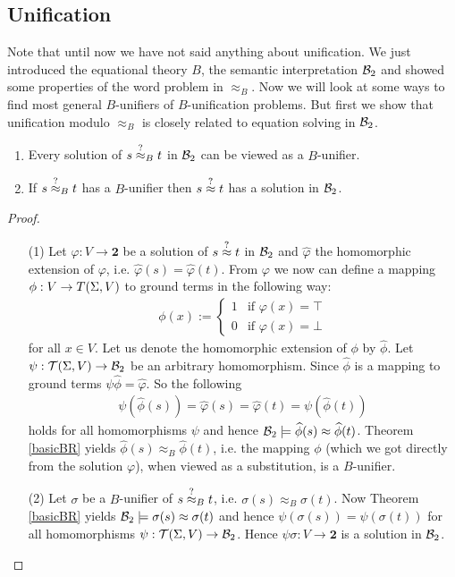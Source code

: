 	\subsection{Unification}
	Note that until now we have not said anything about unification. We just introduced the equational theory $B$, the semantic interpretation ${\mathcal{B}_2}$ and showed some properties of the word problem in $\approx_B$. Now we will look at some ways to find most general $B$-unifiers of $B$-unification problems. But first we show that unification modulo $\approx_B$ is closely related to equation solving in ${\mathcal{B}_2}$.
	\begin{lemma}\mbox{}
		\begin{enumerate}
			\item Every solution of $s\stackrel{?}{\approx}_B t$ in ${\mathcal{B}_2}$ can be viewed as a $B$-unifier.
			\item If $s\stackrel{?}{\approx}_B t$ has a $B$-unifier then $s\stackrel{?}{\approx} t$ has a solution in ${\mathcal{B}_2}$.
		\end{enumerate}
	\end{lemma}
	\begin{proof}\mbox{}
		\begin{itemize}
			\item[(1)]Let $\varphi:V\to\textbf{2}$ be a solution of $s\stackrel{?}{\approx} t$ in ${\mathcal{B}_2}$ and $\widehat{\varphi}$ the homomorphic extension of $\varphi$, i.e. $\widehat{\varphi}(s)=\widehat{\varphi}(t)$. From $\varphi$ we now can define a mapping $\phi:V\to T(\Sigma,V)$ to ground terms in the following way:
			      \begin{align*}
			      	\phi(x):=\begin{cases}
			      	1 & \text{if }\varphi(x)=\top \\
			      	0 & \text{if }\varphi(x)=\bot 
			      	\end{cases}
			      \end{align*}
			      for all $x\in V$. Let us denote the homomorphic extension of $\phi$ by $\widehat{\phi}$. Let $\psi:\mathcal{T}(\Sigma,V)\to{\mathcal{B}_2}$ be an arbitrary homomorphism. Since $\widehat{\phi}$ is a mapping to ground terms $\psi\widehat{\phi}=\widehat{\varphi}$. So the following
			      \begin{align*}
			      	\psi\left( \widehat{\phi}(s)\right)=\widehat{\varphi}(s)=\widehat{\varphi}(t)=\psi\left( \widehat{\phi}(t)\right) 
			      \end{align*}
			      holds for all homomorphisms $\psi$ and hence ${\mathcal{B}_2}\models\widehat{\phi}(s)\approx\widehat{\phi}(t)$. Theorem \ref{basicBR} yields $\widehat{\phi}(s)\approx_B\widehat{\phi}(t)$, i.e. the mapping $\phi$ (which we got directly from the solution $\varphi$), when viewed as a substitution, is a $B$-unifier.
			\item[(2)] Let $\sigma$ be a $B$-unifier of $s\stackrel{?}{\approx}_B t$, i.e. $\sigma(s)\approx_B\sigma(t)$. Now Theorem \ref{basicBR} yields ${\mathcal{B}_2}\models\sigma(s)\approx\sigma(t)$ and hence $\psi\left(\sigma (s)\right)=\psi\left(\sigma (t)\right)$ for all homomorphisms $\psi:\mathcal{T}(\Sigma,V)\to{\mathcal{B}_2}$. Hence $\psi\sigma:V\to\textbf{2}$ is a solution in ${\mathcal{B}_2}$.
		\end{itemize}
	\end{proof}
